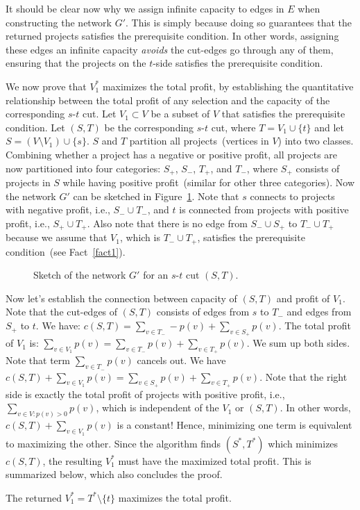 It should be clear now why we assign infinite capacity to edges in $E$ when constructing the network $G'$.
This is simply because doing so guarantees that the returned projects satisfies the prerequisite condition.
In other words, assigning these edges an infinite capacity \emph{avoids} the cut-edges go through any of them,
ensuring that the projects on the $t$-side satisfies the prerequisite condition.


We now prove that $V_1^*$ maximizes the total profit, by establishing the quantitative relationship between the
total profit of any selection and the capacity of the corresponding $s$-$t$ cut.
Let $V_1 \subset V$ be a subset of $V$ that satisfies the prerequisite condition. 
Let $(S,T)$ be the corresponding $s$-$t$ cut, where $T = V_1\cup \{t\}$ and
let $S = (V\setminus V_1)\cup \{s\}$.  %
$S$ and $T$ partition all projects~(vertices in $V$) into two classes.
Combining whether a project has a negative or positive profit, 
all projects are now partitioned into four categories: $S_+$, $S_-$, $T_+$, and $T_-$, where
$S_+$ consists of projects in $S$ while having positive profit~(similar for other three categories).
Now the network $G'$ can be sketched in Figure~\ref{fig:ps5}.
Note that $s$ connects to projects with negative profit, i.e., $S_-\cup T_-$,
and $t$ is connected from projects with positive profit, i.e., $S_+\cup T_+$.
Also note that there is no edge from $S_-\cup S_+$ to $T_-\cup T_+$ because we assume that $V_1$, which is $T_-\cup T_+$, 
satisfies the prerequisite condition~(see Fact~\ref{fact1}). 

\begin{figure}[!h]
\centering{}
\caption{Sketch of the network $G'$ for an $s$-$t$ cut $(S,T)$. }
\label{fig:ps5}
\end{figure}

Now let's establish the connection between capacity of $(S,T)$ and profit of $V_1$.
Note that the cut-edges of $(S,T)$ consists of edges from $s$ to $T_-$ and edges from $S_+$ to $t$.
We have: $c(S, T) = \sum_{v\in T_-} -p(v) + \sum_{v\in S_+} p(v)$.
The total profit of $V_1$ is: $\sum_{v\in V_1} p(v) = \sum_{v\in T_-} p(v) + \sum_{v\in T_+} p(v)$.
We sum up both sides. Note that term $\sum_{v\in T_-} p(v)$ cancels out.
We have $c(S, T) + \sum_{v\in V_1} p(v) = \sum_{v\in S_+} p(v) + \sum_{v\in T_+} p(v)$.
Note that the right side is exactly the total profit of projects with positive profit, i.e., $\sum_{v\in V: p(v) > 0} p(v)$,
which is independent of the $V_1$ or $(S,T)$. In other words, 
$c(S, T) + \sum_{v\in V_1} p(v)$ is a constant! Hence, minimizing one term is equivalent to maximizing the other. 
Since the algorithm finds $(S^*, T^*)$ which minimizes $c(S,T)$, the resulting $V_1^*$ must
have the maximized total profit. This is summarized below, which also concludes the proof.
\begin{fact}
The returned $V_1^* = T^*\setminus\{t\}$ maximizes the total profit.
\end{fact}


